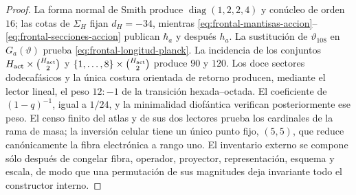 \begin{proof}
La forma normal de Smith produce
\(\operatorname{diag}(1,2,2,4)\) y conúcleo de orden \(16\); las cotas de
\(\Sigma_H\) fijan \(d_H=-34\), mientras
\eqref{eq:frontal-mantisas-accion}--\eqref{eq:frontal-secciones-accion}
publican \(\hbar_a\) y después \(h_a\). La sustitución de
\(\vartheta_{108}\) en \(G_a(\vartheta)\) prueba
\eqref{eq:frontal-longitud-planck}. La incidencia de los conjuntos
\(H_{\rm act}\times\binom{H_{\rm act}}2\) y
\(\{1,\ldots,8\}\times\binom{H_{\rm act}}2\) produce \(90\) y \(120\).
Los doce sectores dodecafásicos y la única costura orientada de retorno
producen, mediante el lector lineal, el peso \(12{:}{-}1\) de la transición
hexada--octada. El coeficiente de \((1-q)^{-1}\), igual a \(1/24\), y la
minimalidad diofántica verifican posteriormente ese peso. El censo finito del atlas y de sus dos lectores
prueba los cardinales de la rama de masa; la inversión celular tiene un único
punto fijo, \((5,5)\), que reduce canónicamente la fibra electrónica a rango
uno. El inventario externo se compone sólo después de congelar fibra,
operador, proyector, representación, esquema y escala, de modo que una
permutación de sus magnitudes deja invariante todo el constructor interno.
\end{proof}
